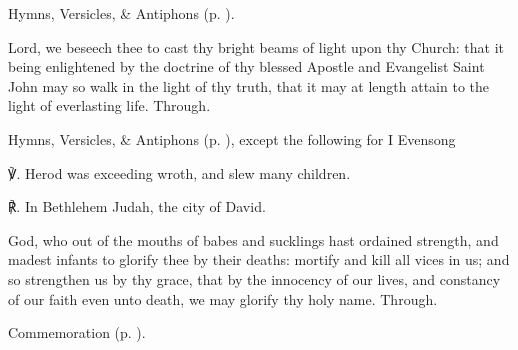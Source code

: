 



\begin{rubric}
	Hymns, Versicles, \& Antiphons  (p. \pageref{SaintJohn}).
\end{rubric}


\collect
{} Lord, we beseech thee to cast thy bright beams of light upon thy Church: that it being enlightened by the doctrine of thy blessed Apostle and Evangelist Saint John may so walk in the light of thy truth, that it may at length attain to the light of everlasting life. Through.




\begin{rubric}
	Hymns, Versicles, \& Antiphons  (p. \pageref{HolyInnocents}), except the following for I Evensong
\end{rubric}

℣. Herod was exceeding wroth, and slew many children.

℟. In Bethlehem Judah, the city of David.


\collect
{} God, who out of the mouths of babes and sucklings hast ordained strength, and madest infants to glorify thee by their deaths: mortify and kill all vices in us; and so strengthen us by thy grace, that by the innocency of our lives, and constancy of our faith even unto death, we may glorify thy holy name. Through.

\begin{rubric}
	Commemoration  (p. \pageref{TitusCollect}).
\end{rubric}



